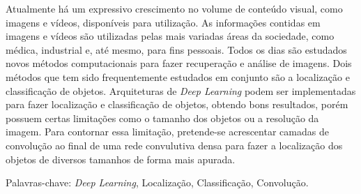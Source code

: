 \begin{resumo}
\vspace{-1cm}

\onehalfspacing

\noindent 
   Atualmente há um expressivo crescimento no volume de conteúdo visual, como imagens e vídeos, disponíveis para utilização. As informações contidas em imagens e vídeos são utilizadas pelas mais variadas áreas da sociedade, como médica, industrial e, até mesmo, para fins pessoais. Todos os dias são estudados novos métodos computacionais para fazer recuperação e análise de imagens. Dois métodos que tem sido frequentemente estudados em conjunto são a localização e classificação de objetos. Arquiteturas de \textit{Deep Learning} podem ser implementadas para fazer localização e classificação de objetos, obtendo bons resultados, porém possuem certas limitações como o tamanho dos objetos ou a resolução da imagem. Para contornar essa limitação, pretende-se acrescentar camadas de convolução ao final de uma rede convulutiva densa para fazer a localização dos objetos de diversos tamanhos de forma mais apurada. %

\vspace*{.75cm}

\noindent Palavras-chave: \textit{Deep Learning}, Localização, Classificação, Convolução.\\ %

\end{resumo}